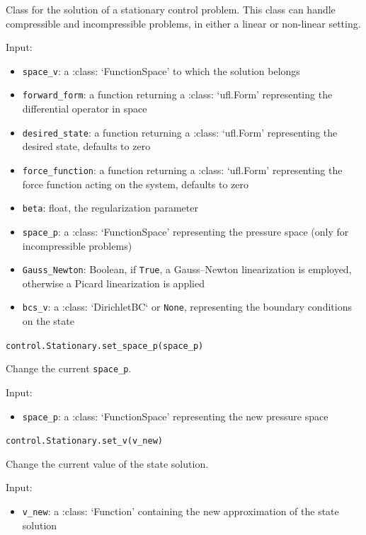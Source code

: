 \documentclass[letterpaper,10pt,english]{sphinxmanual}
\begin{document}
Class for the solution of a stationary control problem. This class can
handle compressible and incompressible problems, in either a linear or
non-linear setting.

Input:
\begin{itemize}
\item \texttt{space\_v}: a :class: `FunctionSpace' to which the solution belongs
\item \texttt{forward\_form}: a function returning a :class: `ufl.Form' representing
        the differential operator in space
\item \texttt{desired\_state}: a function returning a :class: `ufl.Form' representing
        the desired state, defaults to zero
\item \texttt{force\_function}: a function returning a :class: `ufl.Form' representing
        the force function acting on the system, defaults to zero
\item \texttt{beta}: float, the regularization parameter
\item \texttt{space\_p}: a :class: `FunctionSpace' representing the pressure space
        (only for incompressible problems)
\item \texttt{Gauss\_Newton}: Boolean, if \texttt{True}, a Gauss--Newton linearization is
        employed, otherwise a Picard linearization is applied
\item \texttt{bcs\_v}: a :class: `DirichletBC` or \texttt{None}, representing the boundary
        conditions on the state
\end{itemize}


\vspace{3ex}

\texttt{control.Stationary.set{\_}space{\_}p(space{\_}p)}

Change the current \texttt{space\_p}.

Input:
\begin{itemize}
\item \texttt{space{\_}p}: a :class: `FunctionSpace' representing the new
            pressure space
\end{itemize}

\vspace{3ex}

\texttt{control.Stationary.set{\_}v(v{\_}new)}

Change the current value of the state solution.

Input:
\begin{itemize}
\item \texttt{v{\_}new}: a :class: `Function' containing the new approximation
            of the state solution
\end{itemize}
\end{document}
